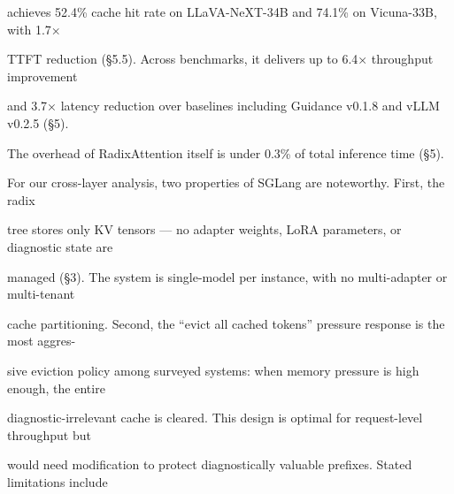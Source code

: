 \begin{flushleft}
\noindent achieves 52.4\% cache hit rate on LLaVA-NeXT-34B and 74.1\% on Vicuna-33B, with 1.7×\par
\noindent TTFT reduction (§5.5). Across benchmarks, it delivers up to 6.4× throughput improvement\par
\noindent and 3.7× latency reduction over baselines including Guidance v0.1.8 and vLLM v0.2.5 (§5).\par
\noindent The overhead of RadixAttention itself is under 0.3\% of total inference time (§5).\par
\noindent  For our cross-layer analysis, two properties of SGLang are noteworthy. First, the radix\par
\noindent tree stores only KV tensors — no adapter weights, LoRA parameters, or diagnostic state are\par
\noindent managed (§3). The system is single-model per instance, with no multi-adapter or multi-tenant\par
\noindent cache partitioning. Second, the “evict all cached tokens” pressure response is the most aggres-\par
\noindent sive eviction policy among surveyed systems: when memory pressure is high enough, the entire\par
\noindent diagnostic-irrelevant cache is cleared. This design is optimal for request-level throughput but\par
\noindent would need modification to protect diagnostically valuable prefixes. Stated limitations include\par
\end{flushleft}
